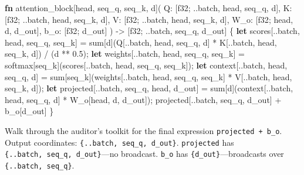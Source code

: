\documentclass[11pt,titlepage]{article}
\newenvironment{Shaded}{}{}
\newcommand{\DataTypeTok}[1]{\textcolor[rgb]{0.56,0.13,0.00}{#1}}
\newcommand{\DecValTok}[1]{\textcolor[rgb]{0.25,0.63,0.44}{#1}}
\newcommand{\KeywordTok}[1]{\textcolor[rgb]{0.00,0.44,0.13}{\textbf{#1}}}
\newcommand{\NormalTok}[1]{#1}
\newcommand{\OperatorTok}[1]{\textcolor[rgb]{0.40,0.40,0.40}{#1}}
\begin{document}
\begin{Shaded}
\begin{Highlighting}[]
\KeywordTok{fn}\NormalTok{ attention_block[head, seq_q, seq_k, d](}
\NormalTok{    Q: }\OperatorTok{[}\DataTypeTok{f32}\NormalTok{; ..batch, head, seq_q, d}\OperatorTok{]}\NormalTok{,}
\NormalTok{    K: }\OperatorTok{[}\DataTypeTok{f32}\NormalTok{; ..batch, head, seq_k, d}\OperatorTok{]}\NormalTok{,}
\NormalTok{    V: }\OperatorTok{[}\DataTypeTok{f32}\NormalTok{; ..batch, head, seq_k, d}\OperatorTok{]}\NormalTok{,}
\NormalTok{    W_o: }\OperatorTok{[}\DataTypeTok{f32}\NormalTok{; head, d, d_out}\OperatorTok{]}\NormalTok{,}
\NormalTok{    b_o: }\OperatorTok{[}\DataTypeTok{f32}\NormalTok{; d_out}\OperatorTok{]}
\NormalTok{) -> }\OperatorTok{[}\DataTypeTok{f32}\NormalTok{; ..batch, seq_q, d_out}\OperatorTok{]}
\OperatorTok{\{}
    \KeywordTok{let}\NormalTok{ scores}\OperatorTok{[}\NormalTok{..batch, head, seq_q, seq_k}\OperatorTok{]}\NormalTok{ =}
\NormalTok{        sum}\OperatorTok{[}\NormalTok{d}\OperatorTok{]}\NormalTok{(Q}\OperatorTok{[}\NormalTok{..batch, head, seq_q, d}\OperatorTok{]}\NormalTok{ * K}\OperatorTok{[}\NormalTok{..batch, head, seq_k, d}\OperatorTok{]}\NormalTok{) / (d ** }\DecValTok{0.5}\NormalTok{);}
    \KeywordTok{let}\NormalTok{ weights}\OperatorTok{[}\NormalTok{..batch, head, seq_q, seq_k}\OperatorTok{]}\NormalTok{ = softmax}\OperatorTok{[}\NormalTok{seq_k}\OperatorTok{]}\NormalTok{(scores}\OperatorTok{[}\NormalTok{..batch, head, seq_q, seq_k}\OperatorTok{]}\NormalTok{);}
    \KeywordTok{let}\NormalTok{ context}\OperatorTok{[}\NormalTok{..batch, head, seq_q, d}\OperatorTok{]}\NormalTok{ =}
\NormalTok{        sum}\OperatorTok{[}\NormalTok{seq_k}\OperatorTok{]}\NormalTok{(weights}\OperatorTok{[}\NormalTok{..batch, head, seq_q, seq_k}\OperatorTok{]}\NormalTok{ * V}\OperatorTok{[}\NormalTok{..batch, head, seq_k, d}\OperatorTok{]}\NormalTok{);}
    \KeywordTok{let}\NormalTok{ projected}\OperatorTok{[}\NormalTok{..batch, seq_q, head, d_out}\OperatorTok{]}\NormalTok{ =}
\NormalTok{        sum}\OperatorTok{[}\NormalTok{d}\OperatorTok{]}\NormalTok{(context}\OperatorTok{[}\NormalTok{..batch, head, seq_q, d}\OperatorTok{]}\NormalTok{ * W_o}\OperatorTok{[}\NormalTok{head, d, d_out}\OperatorTok{]}\NormalTok{);}
\NormalTok{    projected}\OperatorTok{[}\NormalTok{..batch, seq_q, d_out}\OperatorTok{]}\NormalTok{ + b_o}\OperatorTok{[}\NormalTok{d_out}\OperatorTok{]}
\OperatorTok{\}}
\end{Highlighting}
\end{Shaded}

Walk through the auditor's toolkit for the final expression
\texttt{projected\ +\ b\_o}. Output coordinates:
\texttt{\{..batch,\ seq\_q,\ d\_out\}}. \texttt{projected} has
\texttt{\{..batch,\ seq\_q,\ d\_out\}}---no broadcast. \texttt{b\_o} has
\texttt{\{d\_out\}}---broadcasts over \texttt{\{..batch,\ seq\_q\}}.
\end{document}
